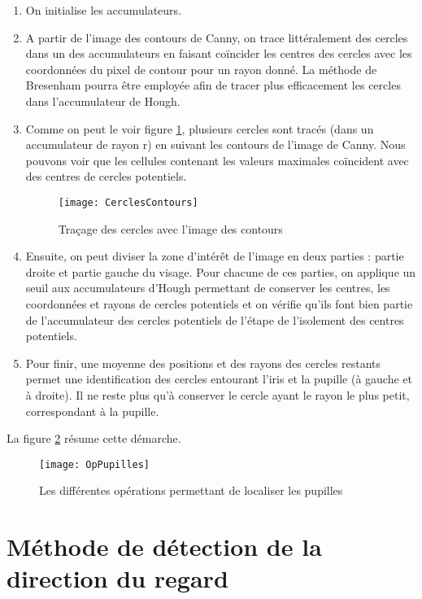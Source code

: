 \begin{enumerate}
\item On initialise les accumulateurs.
\item A partir de l’image des contours de Canny, on trace littéralement des cercles dans un des accumulateurs en faisant coïncider les centres des cercles avec les coordonnées du pixel de contour pour un rayon donné. La méthode de Bresenham pourra être employée afin de tracer plus efficacement les cercles dans l’accumulateur de Hough.
\item Comme on peut le voir figure \ref{fig:CerclesContours}, plusieurs cercles sont tracés (dans un accumulateur de rayon r) en suivant les contours de l’image de Canny. Nous pouvons voir que les cellules contenant les valeurs maximales coïncident avec des centres de cercles potentiels.

\begin{figure}[H]
  \centering
  \texttt{[image: CerclesContours]}
  \caption{Traçage des cercles avec l’image des contours}
  \label{fig:CerclesContours}
\end{figure}

\item Ensuite, on peut diviser la zone d’intérêt de l’image en deux parties : partie droite et partie gauche du visage. Pour chacune de ces parties, on applique un seuil aux accumulateurs d’Hough permettant de conserver les centres, les coordonnées et rayons de cercles potentiels et on vérifie qu’ils font bien partie de l’accumulateur des cercles potentiels de l’étape de l’isolement des centres potentiels.
\item Pour finir, une moyenne des positions et des rayons des cercles restants permet une identification des cercles entourant l’iris et la pupille (à gauche et à droite). Il ne reste plus qu’à conserver le cercle ayant le rayon le plus petit, correspondant à la pupille.
\end{enumerate}

La figure \ref{fig:OpPupilles} résume cette démarche.

\begin{figure}[H]
  \centering
  \texttt{[image: OpPupilles]}
  \caption{Les différentes opérations permettant de localiser les pupilles}
  \label{fig:OpPupilles}
\end{figure}

\section{Méthode de détection de la direction du regard}
\label{MethodeDirectionRegard}

